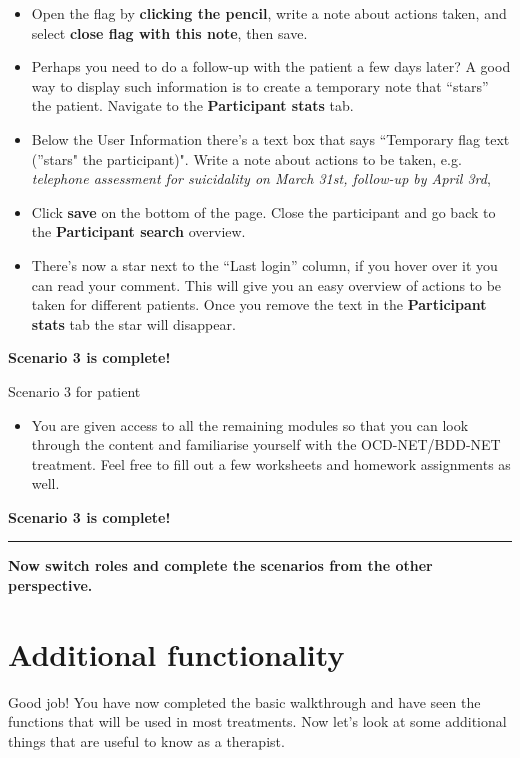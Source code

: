 \documentclass[]{book}
\providecommand{\tightlist}{%
  \setlength{\itemsep}{0pt}\setlength{\parskip}{0pt}}
\begin{document}
\begin{itemize}
\item
  Open the flag by \textbf{clicking the pencil}, write a note about actions taken, and select \textbf{close flag with this note}, then save.
\item
  Perhaps you need to do a follow-up with the patient a few days later? A good way to display such information is to create a temporary note that ``stars'' the patient. Navigate to the \textbf{Participant stats} tab.
\item
  Below the User Information there's a text box that says ``Temporary flag text (''stars" the participant)". Write a note about actions to be taken, e.g. \emph{telephone assessment for suicidality on March 31st, follow-up by April 3rd},
\item
  Click \textbf{save} on the bottom of the page. Close the participant and go back to the \textbf{Participant search} overview.
\item
  There's now a star next to the ``Last login'' column, if you hover over it you can read your comment. This will give you an easy overview of actions to be taken for different patients. Once you remove the text in the \textbf{Participant stats} tab the star will disappear.
\end{itemize}

\textbf{Scenario 3 is complete!}

 Scenario 3 for patient

\begin{itemize}
\tightlist
\item
  You are given access to all the remaining modules so that you can look through the content and familiarise yourself with the OCD-NET/BDD-NET treatment. Feel free to fill out a few worksheets and homework assignments as well.
\end{itemize}

\textbf{Scenario 3 is complete!}

\begin{center}\rule{0.5\linewidth}{\linethickness}\end{center}

\textbf{Now switch roles and complete the scenarios from the other perspective.}

\hypertarget{additional-functionality}{%
\section{Additional functionality}\label{additional-functionality}}

Good job! You have now completed the basic walkthrough and have seen the functions that will be used in most treatments. Now let's look at some additional things that are useful to know as a therapist.
\end{document}

